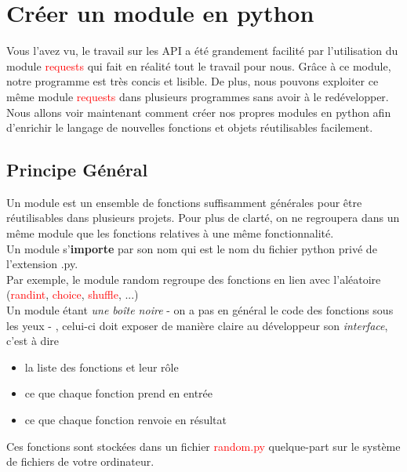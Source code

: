 \documentclass[12pt,fleqn]{book} %
\begin{document}
\section{Créer un module en python}
Vous l'avez vu, le travail sur les API a été grandement facilité par l'utilisation du module \textcolor{red}{requests} qui fait en réalité tout le travail pour nous. Grâce à ce module, notre programme est très concis et lisible. De plus, nous pouvons exploiter ce même module \textcolor{red}{requests} dans plusieurs programmes sans avoir à le redévelopper.\\

Nous allons voir maintenant comment créer nos propres modules en python afin d'enrichir le langage de nouvelles fonctions et objets réutilisables facilement.

\subsection{Principe Général}

Un module est un ensemble de fonctions suffisamment générales pour être réutilisables dans plusieurs projets. Pour plus de clarté, on ne regroupera dans un même module que les fonctions relatives à une même fonctionnalité.\\

Un module s'\textbf{importe} par son nom qui est le nom du fichier python privé de l'extension .py.\\

Par exemple, le module random regroupe des fonctions en lien avec l'aléatoire (\textcolor{red}{randint}, \textcolor{red}{choice}, \textcolor{red}{shuffle}, ...)\\

Un module étant \textit{une boîte noire} - on a pas en général le code des fonctions sous les yeux - , celui-ci doit exposer de manière claire au développeur son \textit{interface}, c'est à dire
\begin{itemize}
	\item la liste des fonctions et leur rôle
	\item ce que chaque fonction prend en entrée
	\item ce que chaque fonction renvoie en résultat
\end{itemize}

Ces fonctions sont stockées dans un fichier \textcolor{red}{random.py} quelque-part sur le système de fichiers de votre ordinateur.\\
\end{document}
